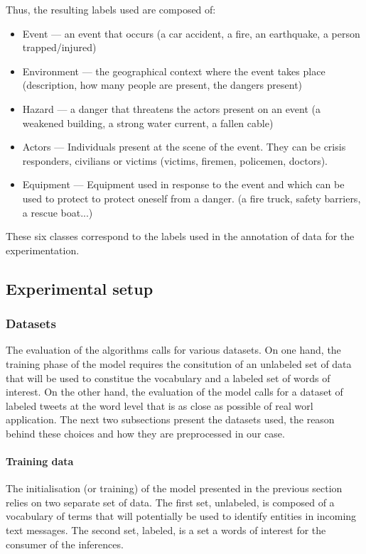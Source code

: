 Thus, the resulting labels used are composed of:

\begin{itemize}
    \item Event — an event that occurs (a car accident, a fire, an earthquake, a person trapped/injured)
    \item Environment — the geographical context where the event takes place (description, how many people are present, the dangers present)
    \item Hazard — a danger that threatens the actors present on an event (a weakened building, a strong water current, a fallen cable)
    \item Actors — Individuals present at the scene of the event. They can be crisis responders, civilians or victims (victims, firemen, policemen, doctors).
    \item Equipment — Equipment used in response to the event and which can be used to protect to protect oneself from a danger. (a fire truck, safety barriers, a rescue boat...)
\end{itemize}

These six classes correspond to the labels used in the annotation of data for the experimentation.

\subsection{Experimental setup}
\subsubsection{Datasets}
The evaluation of the algorithms calls for various datasets.
On one hand, the training phase of the model requires the consitution of an unlabeled set
of data that will be used to constitue the vocabulary and a labeled set of words of interest.
On the other hand, the evaluation of the model calls for a dataset of labeled tweets at
the word level that is as close as possible of real worl application.
The next two subsections present the datasets used, the reason behind these choices and
how they are preprocessed in our case.

\paragraph{Training data}
The initialisation (or training) of the model presented in the previous section relies
on two separate set of data.
The first set, unlabeled, is composed of a vocabulary of terms that will potentially be
used to identify entities in incoming text messages.
The second set, labeled, is a set a words of interest for the consumer of the inferences.

